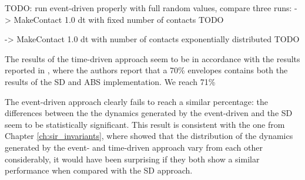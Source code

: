 TODO: run event-driven properly with full random values, compare three runs:
-> MakeContact 1.0 dt with fixed number of contacts
TODO

-> MakeContact 1.0 dt with number of contacts exponentially distributed
TODO

The results of the time-driven approach seem to be in accordance with the results reported in \cite{macal_agent-based_2010}, where the authors report that a 70\% envelopes contains both the results of the SD and ABS implementation. We reach 71\% 

The event-driven approach clearly fails to reach a similar percentage: the differences between the the dynamics generated by the event-driven and the SD seem to be statistically significant. This result is consistent with the one from Chapter \ref{ch:sir_invariants}, where showed that the distribution of the dynamics generated by the event- and time-driven approach vary from each other considerably, it would have been surprising if they both show a similar performance when compared with the SD approach. 

